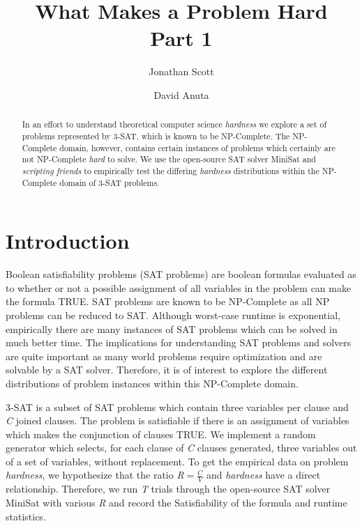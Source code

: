 \documentclass{eptcs}
\title{What Makes a Problem Hard\\
		\large Part 1} %
\author{
Jonathan Scott
\and
David Anuta
}
\begin{document}
\maketitle
\begin{abstract}
In an effort to understand theoretical computer science \textit{hardness} we explore a set of problems represented by 3-SAT, which is known to be NP-Complete. 
The NP-Complete domain, however, contains certain instances of problems which certainly are not NP-Complete \textit{hard} to solve. We use the 
open-source SAT solver MiniSat\cite{minisat} and \textit{scripting friends} to empirically test the differing \textit{hardness} distributions within the NP-Complete
domain of 3-SAT problems.
\end{abstract}
\section*{Introduction}
Boolean satisfiability problems (SAT problems) are boolean formulas evaluated as to whether or not a possible assignment of all variables in the problem can 
make the formula TRUE. SAT problems are known to be NP-Complete as all NP problems can be reduced to SAT. Although worst-case runtime is exponential, empirically there are many instances of SAT problems which can be solved in much better time. The implications for understanding SAT problems and solvers are quite important as many world problems require optimization and are solvable by a SAT solver. Therefore, it is of interest to explore the different distributions of problem instances within this NP-Complete domain.

3-SAT is a subset of SAT problems which contain three variables per clause and \textit{C} joined clauses. The problem is satisfiable if there is an assignment of variables which makes the conjunction of clauses TRUE. We implement a random generator which selects, for each clause of \textit{C} clauses generated, three variables out of a set of  variables, without replacement. To get the empirical data on problem \textit{hardness}, we hypothesize that the ratio \textit{R}$=\frac{C}{V}$ and \textit{hardness} have a direct relationship. Therefore, we run \textit{T} trials through the open-source SAT solver MiniSat with various \textit{R} and record the Satisfiability of the formula and runtime statistics.
\end{document}
